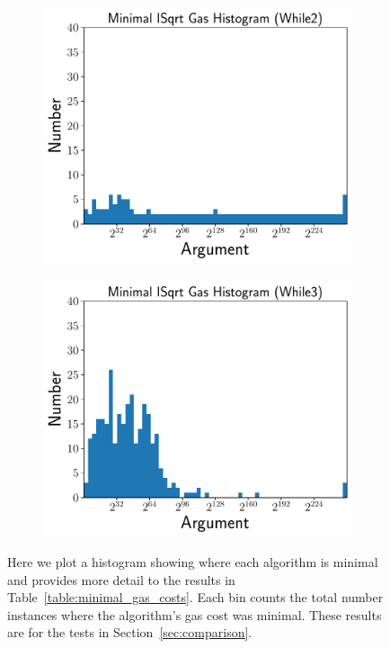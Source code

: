 \begin{figure}[p]
    \begin{subfigure}[t]{0.45\textwidth}
    \includegraphics[width=\textwidth]{plots/minimal_hist_While2.pdf}
    \end{subfigure}
    \begin{subfigure}[t]{0.45\textwidth}
    \includegraphics[width=\textwidth]{plots/minimal_hist_While3.pdf}
    \end{subfigure}
    \caption{Here we plot a histogram showing where each algorithm is minimal
        and provides more detail to the results
        in Table~\ref{table:minimal_gas_costs}.
        Each bin counts the total number instances where the algorithm's
        gas cost was minimal.
        These results are for the tests in Section~\ref{sec:comparison}.
        }
    \label{fig:minimal_gas_hist}
\end{figure}
